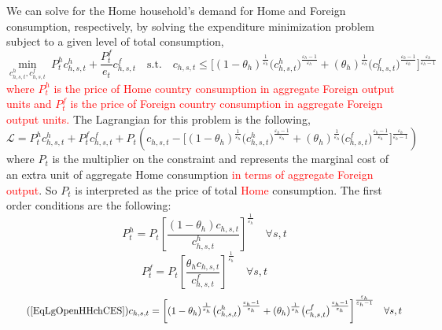 \documentclass[letterpaper,12pt]{article}
\theoremstyle{definition}
\newcommand\ve{\varepsilon}
\begin{document}
    We can solve for the Home household's demand for Home and Foreign consumption, respectively, by solving the expenditure minimization problem subject to a given level of total consumption,
    \begin{equation}\label{EqLgOpenHHminprobH}
      \min_{c^h_{h,s,t},c^f_{h,s,t}} \: P^h_t c^h_{h,s,t} + \frac{P^f_t}{e_t}c^f_{h,s,t} \quad \text{s.t.} \quad c_{h,s,t} \leq \biggl[(1 - \theta_h)^\frac{1}{\ve_h}\bigl(c^h_{h,s,t}\bigr)^\frac{\ve_h-1}{\ve_h} + (\theta_h)^\frac{1}{\ve_h}\bigl(c^f_{h,s,t}\bigr)^\frac{\ve_h-1}{\ve_h}\biggr]^\frac{\ve_h}{\ve_h-1}
    \end{equation}
    \textcolor{red}{where $P^h_t$ is the price of Home country consumption in aggregate Foreign output units and  $P^f_t$ is the price of Foreign country consumption in aggregate Foreign output units.} The Lagrangian for this problem is the following,
    \begin{equation}\label{EqLgOpenHHlagrH}
      \mathcal{L} = P^h_t c^h_{h,s,t} + P^f_tc^f_{h,s,t} + P_t\left(c_{h,s,t} - \biggl[(1 - \theta_h)^\frac{1}{\ve_h}\bigl(c^h_{h,s,t}\bigr)^\frac{\ve_h-1}{\ve_h} + (\theta_h)^\frac{1}{\ve_h}\bigl(c^f_{h,s,t}\bigr)^\frac{\ve_h-1}{\ve_h}\biggr]^\frac{\ve_h}{\ve_h-1}\right)
    \end{equation}
    where $P_t$ is the multiplier on the constraint and represents the marginal cost of an extra unit of aggregate Home consumption \textcolor{red}{in terms of aggregate Foreign output}. So $P_t$ is interpreted as the price of total \textcolor{red}{Home} consumption. The first order conditions are the following:
    \begin{equation}\label{EqLgOpenHHfocChh}
      P^h_t = P_t\left[\frac{(1-\theta_h) c_{h,s,t}}{c^h_{h,s,t}}\right]^{\frac{1}{\ve_h}} \quad\forall s,t
    \end{equation}
    \begin{equation}\label{EqLgOpenHHfocChf}
      P^f_t = P_t\left[\frac{\theta_h c_{h,s,t}}{c^f_{h,s,t}}\right]^{\frac{1}{\ve_h}} \quad\forall s,t
    \end{equation}
    \begin{equation}\tag{\ref{EqLgOpenHHchCES}}
      c_{h,s,t}= \biggl[(1 - \theta_h)^\frac{1}{\ve_h}\bigl(c^h_{h,s,t}\bigr)^\frac{\ve_h-1}{\ve_h} + (\theta_h)^\frac{1}{\ve_h}\bigl(c^f_{h,s,t}\bigr)^\frac{\ve_h-1}{\ve_h}\biggr]^\frac{\ve_h}{\ve_h-1} \quad\forall s,t
    \end{equation}
\end{document}
